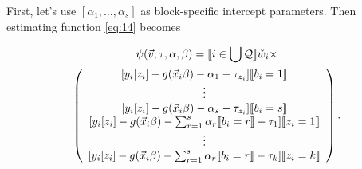 \documentclass{article}
\DeclarePairedDelimiter{\indicator}{\llbracket}{\rrbracket}
\newcommand{\owt}[1][{[z_{i}]}]{\ensuremath{\check{w}_{i#1}}}
\begin{document}
First, let's use $[\alpha_{1}, \ldots, \alpha_{s}]$
as block-specific intercept parameters. Then 
estimating function \eqref{eq:14} becomes

\begin{multline}
  \label{eq:9}
  \psi(\vec{v}; \tau, \alpha, \beta) =
  \indicator{i \in \bigcup \mathcal{Q}} \owt[]\times \\  
  \left(
    \begin{array}{c}
           [y_{i}[z_{i}] - g(\vec{x}_{i}\beta)-
                  \alpha_{1} -
      \tau_{z_{i}}]\indicator{b_{i}=1}\\
      \vdots\\ 
          {} [y_{i}[z_{i}] - g(\vec{x}_{i}\beta)-
                  \alpha_{s} -
      \tau_{z_{i}}]\indicator{b_{i}=s}\\      
         {}  [y_{i}[z_{i}] - g(\vec{x}_{i}\beta)-
                  \sum_{r=1}^s\alpha_r\indicator{b_i=r}-\tau_{1}]\indicator{z_{i}=1}\\
                  \vdots \\
          {} [y_{i}[z_{i}] - g(\vec{x}_{i}\beta)-
                 \sum_{r=1}^s\alpha_r\indicator{b_i=r} - \tau_{k}]\indicator{z_{i}=k}\\
    \end{array}
\right).
\end{multline}
\end{document}
